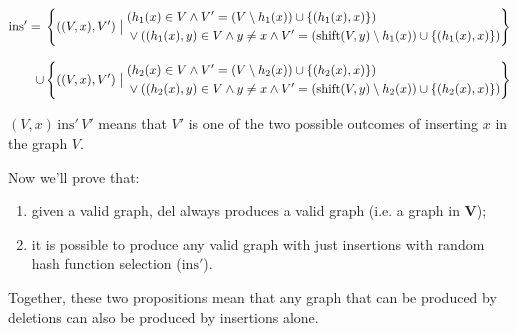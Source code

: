 \documentclass[a4paper, 12pt]{article}
\begin{document}
\begin{align*}
\mathrm{ins'} ={} &\left\{ ((V, x), V') \bigm|
    \begin{aligned}
      &(h_1(x) \in V \wedge V' = (V \setminus h_1(x)) \cup \left\{ (h_1(x), x) \right\}) \\
      &\vee ((h_1(x), y) \in V \wedge y \neq x \wedge V' = (\mathrm{shift}(V, y) \setminus h_1(x)) \cup \left\{ (h_1(x), x) \right\})
    \end{aligned}\right\} \\[2ex]
    \cup{}
    &\left\{ ((V, x), V') \bigm|
    \begin{aligned}
      &(h_2(x) \in V \wedge V' = (V \setminus h_2(x)) \cup \left\{ (h_2(x), x) \right\}) \\
      &\vee ((h_2(x), y) \in V \wedge y \neq x \wedge V' = (\mathrm{shift}(V, y) \setminus h_2(x)) \cup \left\{ (h_2(x), x) \right\})
    \end{aligned}
  \right\}
\end{align*}

\((V, x)\,\mathrm{ins'}\,V'\) means that \(V'\) is one of the two possible outcomes of inserting \(x\) in the graph \(V\).

Now we'll prove that:
\begin{enumerate}
\item given a valid graph, del always produces a valid graph (i.e. a graph in \(\mathbf{V}\));
\item it is possible to produce any valid graph with just insertions with random hash function selection (\(\mathrm{ins'}\)).
\end{enumerate}

Together, these two propositions mean that any graph that can be produced by deletions can also be produced by insertions alone.
\end{document}
